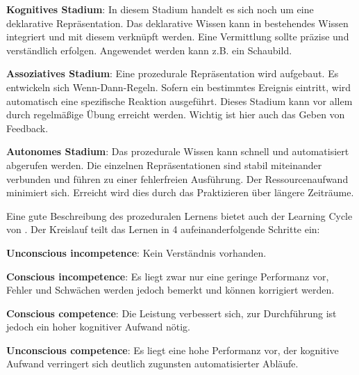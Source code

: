 \documentclass[doc,a4paper,12pt]{apa6}
\begin{document}
\begin{compactenum}
  \item \textbf{Kognitives Stadium}: In diesem Stadium handelt es sich noch um eine deklarative Repräsentation. Das deklarative Wissen kann in bestehendes Wissen integriert und mit diesem verknüpft werden. Eine Vermittlung sollte präzise und verständlich erfolgen. Angewendet werden kann z.B. ein Schaubild.
  \item \textbf{Assoziatives Stadium}: Eine prozedurale Repräsentation wird aufgebaut. Es entwickeln sich Wenn-Dann-Regeln. Sofern ein bestimmtes Ereignis eintritt, wird automatisch eine spezifische Reaktion ausgeführt. Dieses Stadium kann vor allem durch regelmäßige Übung erreicht werden. Wichtig ist hier auch das Geben von Feedback.
  \item \textbf{Autonomes Stadium}: Das prozedurale Wissen kann schnell und automatisiert abgerufen werden. Die einzelnen Repräsentationen sind stabil miteinander verbunden und führen zu einer fehlerfreien Ausführung. Der Ressourcenaufwand minimiert sich. Erreicht wird dies durch das Praktizieren über längere Zeiträume.
\end{compactenum}

Eine gute Beschreibung des prozeduralen Lernens bietet auch der Learning Cycle von \textcite{whitmore2009coaching}. Der Kreislauf teilt das Lernen in 4 aufeinanderfolgende Schritte ein:

\begin{compactenum}
  \item \textbf{Unconscious incompetence}: Kein Verständnis vorhanden.
  \item \textbf{Conscious incompetence}: Es liegt zwar nur eine geringe Performanz vor, Fehler und Schwächen werden jedoch bemerkt und können korrigiert werden.
  \item \textbf{Conscious competence}: Die Leistung verbessert sich, zur Durchführung ist jedoch ein hoher kognitiver Aufwand nötig.
  \item \textbf{Unconscious competence}: Es liegt eine hohe Performanz vor, der kognitive Aufwand verringert sich deutlich zugunsten automatisierter Abläufe.
\end{compactenum}
\end{document}
